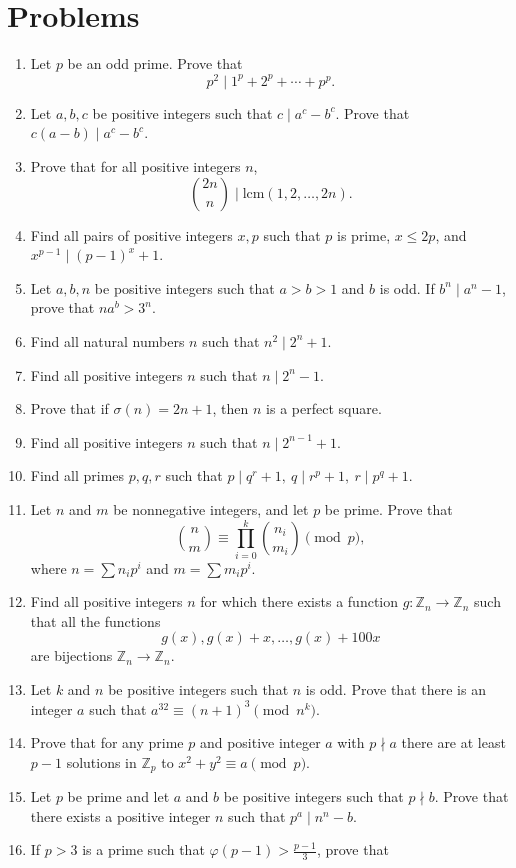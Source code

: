 \documentclass{article}
\newcommand\lcm{\mathrm{lcm}}
\newcommand\Zz{\mathbb{Z}}
\begin{document}
\section{Problems}
\begin{enumerate}
  \item Let $p$ be an odd prime. Prove that
    \[p^2\mid 1^p+2^p+\cdots+p^p.\]
  \item Let $a,b,c$ be positive integers such that $c\mid a^c-b^c$. Prove that
    $c(a-b)\mid a^c-b^c$.
  \item Prove that for all positive integers $n$,
    \[\binom{2n}n\mid\lcm(1,2,\ldots,2n).\]
  \item Find all pairs of positive integers $x,p$ such that $p$ is prime, $x\le
    2p$, and $x^{p-1}\mid (p-1)^x+1$.
  \item Let $a,b,n$ be positive integers such that $a>b>1$ and $b$ is odd. If
    $b^n\mid a^n-1$, prove that $na^b>3^n$.
  \item Find all natural numbers $n$ such that $n^2\mid 2^n+1$.
  \item Find all positive integers $n$ such that $n\mid 2^n-1$.
  \item Prove that if $\sigma(n)=2n+1$, then $n$ is a perfect square.
  \item Find all positive integers $n$ such that $n\mid 2^{n-1}+1$.
  \item Find all primes $p,q,r$ such that $p\mid q^r+1,\ q\mid r^p+1,\ r\mid
    p^q+1$.
  \item Let $n$ and $m$ be nonnegative integers, and let $p$ be prime. Prove
    that
    \[\binom nm\equiv\prod_{i=0}^k\binom{n_i}{m_i}\pmod p,\]
    where $n=\sum n_i p^i$ and $m=\sum m_i p^i$.
  \item Find all positive integers $n$ for which there exists a function
    $g:\Zz_n\to\Zz_n$ such that all the functions
    \[g(x),g(x)+x,\ldots,g(x)+100x\]
    are bijections $\Zz_n\to\Zz_n$.
  \item Let $k$ and $n$ be positive integers such that $n$ is odd. Prove that
    there is an integer $a$ such that $a^{32}\equiv(n+1)^3\pmod{n^k}$.
  \item Prove that for any prime $p$ and positive integer $a$ with $p\nmid a$
    there are at least $p-1$ solutions in $\Zz_p$ to $x^2+y^2\equiv a\pmod p$.
  \item Let $p$ be prime and let $a$ and $b$ be positive integers such that
    $p\nmid b$. Prove that there exists a positive integer $n$ such that
    $p^a\mid n^n-b$.
  \item If $p>3$ is a prime such that $\varphi(p-1)>\frac{p-1}3$, prove that

\end{enumerate}
\end{document}
